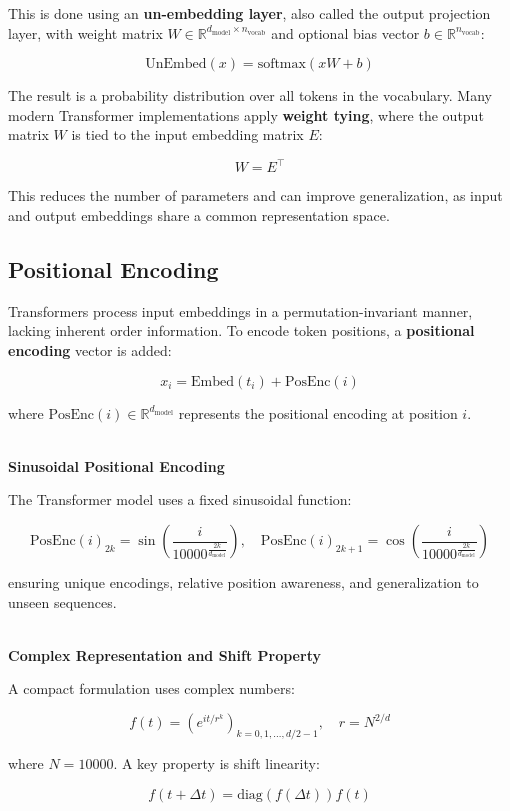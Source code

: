 This is done using an \textbf{un-embedding layer}, also called the output projection layer, with weight matrix $W \in \mathbb{R}^{d_{\text{model}} \times n_{\text{vocab}}}$ and optional bias vector $b \in \mathbb{R}^{n_{\text{vocab}}}$:

\[
\text{UnEmbed}(x) = \text{softmax}(xW + b)
\]

The result is a probability distribution over all tokens in the vocabulary. Many modern Transformer implementations apply \textbf{weight tying}, where the output matrix $W$ is tied to the input embedding matrix $E$:

\[
W = E^\top
\]

This reduces the number of parameters and can improve generalization, as input and output embeddings share a common representation space.

\subsection{Positional Encoding}

Transformers process input embeddings in a permutation-invariant manner, lacking inherent order information. To encode token positions, a \textbf{positional encoding} vector is added:

\[
x_i = \text{Embed}(t_i) + \text{PosEnc}(i)
\]

where $\text{PosEnc}(i) \in \mathbb{R}^{d_{\text{model}}}$ represents the positional encoding at position $i$.

${}$\\
\textbf{Sinusoidal Positional Encoding}

The Transformer model uses a fixed sinusoidal function:

\[
\text{PosEnc}(i)_{2k} = \sin\left(\frac{i}{10000^{\frac{2k}{d_{\text{model}}}}}\right), \quad
\text{PosEnc}(i)_{2k+1} = \cos\left(\frac{i}{10000^{\frac{2k}{d_{\text{model}}}}}\right)
\]

ensuring unique encodings, relative position awareness, and generalization to unseen sequences.

${}$\\
\textbf{Complex Representation and Shift Property}

A compact formulation uses complex numbers:

\[
f(t) = \left( e^{i t / r^k} \right)_{k=0,1,\dots,d/2 -1}, \quad r = N^{2/d}
\]

where $N = 10000$. A key property is shift linearity:

\[
f(t + \Delta t) = \text{diag}(f(\Delta t)) f(t)
\]

